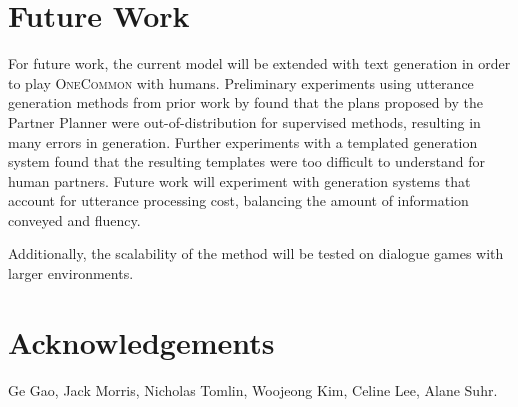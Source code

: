 \documentclass[11pt]{article}
\begin{document}
\section{Future Work}
For future work, the current model will be extended with text generation in order to play \textsc{OneCommon} with humans.
Preliminary experiments using utterance generation methods from prior work by \citet{fried} found that the plans proposed by the Partner Planner were out-of-distribution for supervised methods, resulting in many errors in generation.
Further experiments with a templated generation system found that the resulting templates were too difficult to understand for human partners.
Future work will experiment with generation systems that account for utterance processing cost, balancing the amount of information conveyed and fluency.

Additionally, the scalability of the method will be tested on dialogue games with larger environments.


\section*{Acknowledgements}
Ge Gao, Jack Morris, Nicholas Tomlin, Woojeong Kim, Celine Lee, Alane Suhr.

\begin{comment}
\section*{Limitations}
There is a tradeoff between expressivity and  controllability for dialogue partner modeling.
In this work, we emphasize controllability by explicitly modeling certain aspects of the partner perspective while not accounting for others, resulting in biased agents.
The failure to account for
particular partner aspects may affect fairness and equity with a diverse pool of partners.
\end{comment}



\end{document}
